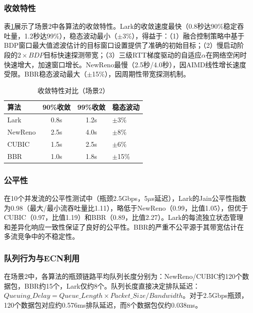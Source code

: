 \documentclass[10pt,twocolumn]{article}
\begin{document}
\subsubsection{收敛特性}

表\ref{tab:convergence}展示了场景2中各算法的收敛特性。Lark的收敛速度最快（0.8秒达90\%稳定吞吐量，1.2秒达99\%），稳态波动最小（$\pm$3\%），得益于：（1）融合控制策略中基于BDP窗口最大值滤波估计的目标窗口设置提供了准确的初始目标；（2）慢启动阶段的$2 \times BDP$目标快速探测带宽；（3）三级RTT梯度驱动的自适应$\alpha$在网络空闲时快速增大，加速窗口增长。NewReno最慢（2.5秒/4.0秒），因AIMD线性增长速度受限。BBR稳态波动最大（$\pm$15\%），因周期性带宽探测机制。

\begin{table}[htbp]
\centering
\caption{收敛特性对比（场景2）}
\label{tab:convergence}
\small
\begin{tabular}{lccl}
\toprule
\textbf{算法} & \textbf{90\%收敛} & \textbf{99\%收敛} & \textbf{稳态波动} \\
\midrule
Lark & 0.8s & 1.2s & $\pm$3\% \\
NewReno & 2.5s & 4.0s & $\pm$8\% \\
CUBIC & 1.5s & 2.5s & $\pm$6\% \\
BBR & 1.0s & 1.8s & $\pm$15\% \\
\bottomrule
\end{tabular}
\end{table}

\subsubsection{公平性}

在10个并发流的公平性测试中（瓶颈2.5Gbps，5$\mu$s延迟），Lark的Jain公平性指数为0.98（最大/最小流吞吐量比1.11），略低于NewReno（0.99，比值1.05），但优于CUBIC（0.97，比值1.19）和BBR（0.89，比值2.27）。Lark的每流独立状态管理和差异化响应一致性保证了良好的公平性。BBR的严重不公平源于其带宽估计在多流竞争中的不稳定性。

\subsubsection{队列行为与ECN利用}

在场景2中，各算法的瓶颈链路平均队列长度分别为：NewReno/CUBIC约120个数据包，BBR约15个，Lark仅约8个。队列长度直接决定排队延迟：$Queuing\_Delay = Queue\_Length \times Packet\_Size / Bandwidth$。对于2.5Gbps瓶颈，120个数据包对应约0.576ms排队延迟，而8个数据包仅约0.038ms。
\end{document}
